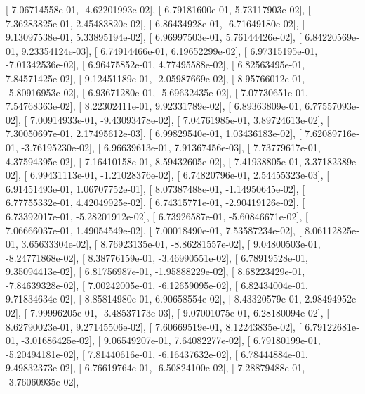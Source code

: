 \documentclass{article}
\begin{document}
       [  7.06714558e-01,  -4.62201993e-02],
       [  6.79181600e-01,   5.73117903e-02],
       [  7.36283825e-01,   2.45483820e-02],
       [  6.86434928e-01,  -6.71649180e-02],
       [  9.13097538e-01,   5.33895194e-02],
       [  6.96997503e-01,   5.76144426e-02],
       [  6.84220569e-01,   9.23354124e-03],
       [  6.74914466e-01,   6.19652299e-02],
       [  6.97315195e-01,  -7.01342536e-02],
       [  6.96475852e-01,   4.77495588e-02],
       [  6.82563495e-01,   7.84571425e-02],
       [  9.12451189e-01,  -2.05987669e-02],
       [  8.95766012e-01,  -5.80916953e-02],
       [  6.93671280e-01,  -5.69632435e-02],
       [  7.07730651e-01,   7.54768363e-02],
       [  8.22302411e-01,   9.92331789e-02],
       [  6.89363809e-01,   6.77557093e-02],
       [  7.00914933e-01,  -9.43093478e-02],
       [  7.04761985e-01,   3.89724613e-02],
       [  7.30050697e-01,   2.17495612e-03],
       [  6.99829540e-01,   1.03436183e-02],
       [  7.62089716e-01,  -3.76195230e-02],
       [  6.96639613e-01,   7.91367456e-03],
       [  7.73779617e-01,   4.37594395e-02],
       [  7.16410158e-01,   8.59432605e-02],
       [  7.41938805e-01,   3.37182389e-02],
       [  6.99431113e-01,  -1.21028376e-02],
       [  6.74820796e-01,   2.54455323e-03],
       [  6.91451493e-01,   1.06707752e-01],
       [  8.07387488e-01,  -1.14950645e-02],
       [  6.77755332e-01,   4.42049925e-02],
       [  6.74315771e-01,  -2.90419126e-02],
       [  6.73392017e-01,  -5.28201912e-02],
       [  6.73926587e-01,  -5.60846671e-02],
       [  7.06666037e-01,   1.49054549e-02],
       [  7.00018490e-01,   7.53587234e-02],
       [  8.06112825e-01,   3.65633304e-02],
       [  8.76923135e-01,  -8.86281557e-02],
       [  9.04800503e-01,  -8.24771868e-02],
       [  8.38776159e-01,  -3.46990551e-02],
       [  6.78919528e-01,   9.35094413e-02],
       [  6.81756987e-01,  -1.95888229e-02],
       [  8.68223429e-01,  -7.84639328e-02],
       [  7.00242005e-01,  -6.12659095e-02],
       [  6.82434004e-01,   9.71834634e-02],
       [  8.85814980e-01,   6.90658554e-02],
       [  8.43320579e-01,   2.98494952e-02],
       [  7.99996205e-01,  -3.48537173e-03],
       [  9.07001075e-01,   6.28180094e-02],
       [  8.62790023e-01,   9.27145506e-02],
       [  7.60669519e-01,   8.12243835e-02],
       [  6.79122681e-01,  -3.01686425e-02],
       [  9.06549207e-01,   7.64082277e-02],
       [  6.79180199e-01,  -5.20494181e-02],
       [  7.81440616e-01,  -6.16437632e-02],
       [  6.78444884e-01,   9.49832373e-02],
       [  6.76619764e-01,  -6.50824100e-02],
       [  7.28879488e-01,  -3.76060935e-02],
\end{document}

